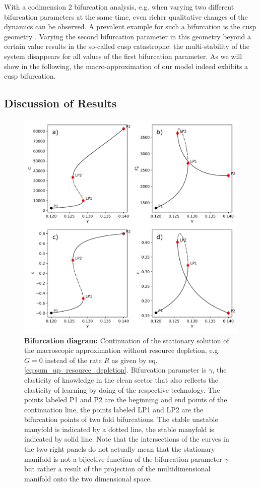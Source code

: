 With a codimension 2 bifurcation analysis, e.g. when varying two different bifurcation parameters at the same time, even richer qualitative changes of the dynamics can be observed. A prevalent example for such a bifurcation is the cusp geometry \citep[][p.\.397]{Kuznetsov1998}. Varying the second bifurcation parameter in this geometry beyond a certain value results in the so-called cusp catastrophe: the multi-stability of the system disappears for all values of the first bifurcation parameter. As we will show in the following, the macro-approximation of our model indeed exhibits a cusp bifurcation. 



\subsection{Discussion of Results}

\begin{figure}[ht!]
\centering\includegraphics[width=.95\linewidth]{figures/ba_plot.pdf}
\caption{\textbf{Bifurcation diagram:} Continuation of the stationary solution of the macroscopic approximation without resource depletion, e.g. $\dot{G} = 0$ instead of the rate $R$ as given by eq. \eqref{eq:sum_up_resource_depletion}. Bifurcation parameter is $\gamma$, the elasticity of knowledge in the clean sector that also reflects the elasticity of learning by doing of the respective technology. The points labeled P1 and P2 are the beginning and end points of the continuation line, the points labeled LP1 and LP2 are the bifurcation points of two fold bifurcations. The stable unstable manyfold is indicated by a dotted line, the stable manyfold is indicated by solid line. Note that the intersections of the curves in the two right panels do not actually mean that the stationary manifold is not a bijective function of the bifurcation parameter $\gamma$ but rather a result of the projection of the multidimensional manifold onto the two dimensional space.\label{fig:bifurcation_analysis}}
\end{figure}

